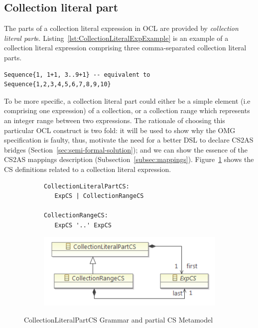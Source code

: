 \documentclass{llncs}
\begin{document}
\subsection{Collection literal part}

The parts of a collection literal expression in OCL are provided by \textit{collection literal part}s. Listing~\ref{lst:CollectionLiteralExpExample} is an example of a collection literal expression comprising three comma-separated collection literal parts.

\begin{lstlisting}[label=lst:CollectionLiteralExpExample, language=OCL]
Sequence{1, 1+1, 3..9+1} -- equivalent to Sequence{1,2,3,4,5,6,7,8,9,10}
\end{lstlisting}

To be more specific, a collection literal part could either be a simple element (i.e comprising one expression) of a collection, or a collection range which represents an integer range between two expressions. The rationale of choosing this particular OCL construct is two fold: it will be used to show why the OMG specification is faulty, thus, motivate the need for a better DSL to declare CS2AS bridges (Section~\ref{sec:semi-formal-solution}); and we can show the essence of the CS2AS mappings description (Subsection~\ref{subsec:mappings}). Figure~\ref{fig:CollectionLiteralPartCS} shows the CS definitions related to a collection literal expression.

\begin{figure}[htbp]
\centering
\begin{subfigure}{0.5\textwidth}
  \centering
\begin{lstlisting}[language=Xtext]
CollectionLiteralPartCS:
   ExpCS | CollectionRangeCS

CollectionRangeCS:
   ExpCS '..' ExpCS
\end{lstlisting} 
\end{subfigure}%
\begin{subfigure}{0.5\textwidth}
  \centering
  \includegraphics[scale=0.75]{images/CollectionLiteralPartCS.png}
\end{subfigure}
\caption{CollectionLiteralPartCS Grammar and partial CS Metamodel}
\label{fig:CollectionLiteralPartCS}
\end{figure}
\end{document}
